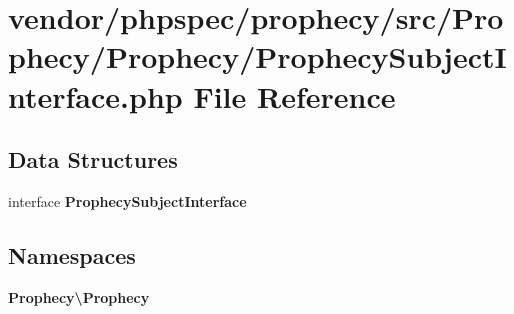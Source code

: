 \section{vendor/phpspec/prophecy/src/\+Prophecy/\+Prophecy/\+Prophecy\+Subject\+Interface.php File Reference}
\label{_prophecy_subject_interface_8php}
\subsection*{Data Structures}
\begin{DoxyCompactItemize}
\item 
interface {\bf Prophecy\+Subject\+Interface}
\end{DoxyCompactItemize}
\subsection*{Namespaces}
\begin{DoxyCompactItemize}
\item 
 {\bf Prophecy\textbackslash{}\+Prophecy}
\end{DoxyCompactItemize}
